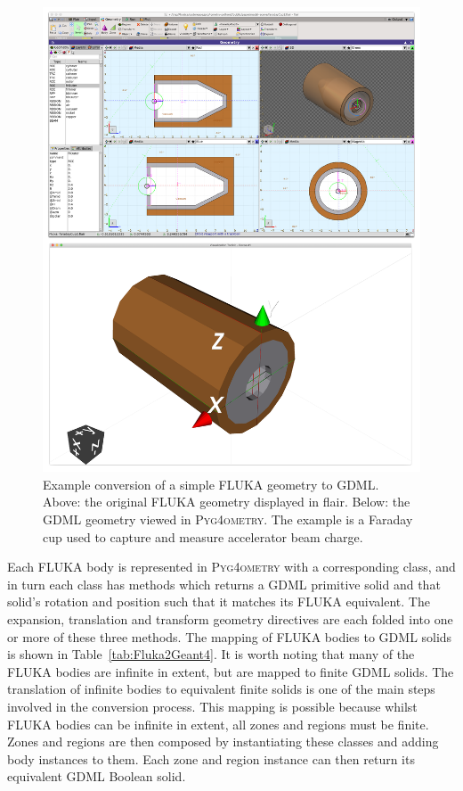 \documentclass[final,5p,times,twocolumn]{elsarticle}
\newcommand{\PYGEOMETRY}{\textsc{Pyg4ometry}}
\begin{document}
\begin{figure}[htbp]
\begin{center}
\includegraphics[width=0.9\columnwidth]{./model-scene/faradayCup2.pdf}
\caption{Example conversion of a simple FLUKA geometry to GDML. Above:
the original FLUKA geometry displayed in flair. Below: the GDML geometry
viewed in \PYGEOMETRY{}. The example is a Faraday cup used to capture
and measure accelerator beam charge.}
\label{fig:fluka-to-geant4-cup}
\end{center}
\end{figure}

Each FLUKA body is represented in \PYGEOMETRY{} with a corresponding
class, and in turn each class has methods which returns a GDML
primitive solid and that solid's rotation and position such that it
matches its FLUKA equivalent.  The expansion, translation and
transform geometry directives are each folded into one or more of
these three methods.  The mapping of FLUKA bodies to GDML solids is
shown in Table~\ref{tab:Fluka2Geant4}.  It is worth noting that many
of the FLUKA bodies are infinite in extent, but are mapped to finite
GDML solids.  The translation of infinite bodies to equivalent finite
solids is one of the main steps involved in the conversion process.
This mapping is possible because whilst FLUKA bodies can be infinite
in extent, all zones and regions must be finite.  Zones and regions
are then composed by instantiating these classes and adding body
instances to them.  Each zone and region instance can then return its
equivalent GDML Boolean solid.
\end{document}
